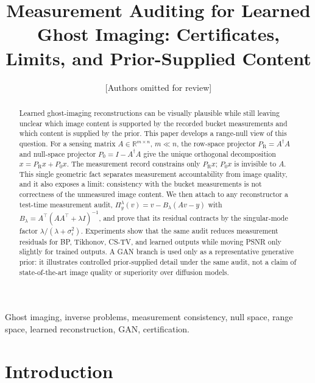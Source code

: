 \documentclass[journal]{IEEEtran}
\newcommand{\R}{\mathbb{R}}
\newcommand{\pinv}{\dagger}
\newcommand{\PR}{P_{\mathrm{R}}}
\newcommand{\PZ}{P_{0}}
\newcommand{\Audit}{\Pi_y^\lambda}
\newcommand{\Blambda}{B_\lambda}
\begin{document}
\title{Measurement Auditing for Learned Ghost Imaging: Certificates, Limits, and Prior-Supplied Content}

\author{[Authors omitted for review]}


\maketitle

\begin{abstract}
Learned ghost-imaging reconstructions can be visually plausible while still leaving unclear which image content is supported by the recorded bucket measurements and which content is supplied by the prior.  This paper develops a range-null view of this question.  For a sensing matrix $A\in\R^{m\times n}$, $m\ll n$, the row-space projector $\PR=A^\pinv A$ and null-space projector $\PZ=I-A^\pinv A$ give the unique orthogonal decomposition $x=\PR x+\PZ x$.  The measurement record constrains only $\PR x$; $\PZ x$ is invisible to $A$.  This single geometric fact separates measurement accountability from image quality, and it also exposes a limit: consistency with the bucket measurements is not correctness of the unmeasured image content.  We then attach to any reconstructor a test-time measurement audit,
$\Audit(v)=v-\Blambda(Av-y)$ with $\Blambda=A^\top(AA^\top+\lambda I)^{-1}$, and prove that its residual contracts by the singular-mode factor $\lambda/(\lambda+\sigma_i^2)$.  Experiments show that the same audit reduces measurement residuals for BP, Tikhonov, CS-TV, and learned outputs while moving PSNR only slightly for trained outputs.  A GAN branch is used only as a representative generative prior: it illustrates controlled prior-supplied detail under the same audit, not a claim of state-of-the-art image quality or superiority over diffusion models.
\end{abstract}

\begin{IEEEkeywords}
Ghost imaging, inverse problems, measurement consistency, null space, range space, learned reconstruction, GAN, certification.
\end{IEEEkeywords}

\section{Introduction}
\end{document}
